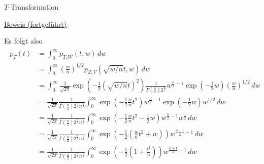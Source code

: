 \documentclass[
  8pt,
  ignorenonframetext,
]{beamer}
\begin{document}
\begin{frame}{\(T\)-Transformation}
\protect\hypertarget{t-transformation-6}{}
\footnotesize

\underline{Beweis (fortgeführt)} \vspace{1mm}

Es folgt also \tiny \begin{align}
\begin{split}
p_T(t)
& =
\int_0^\infty  p_{T,W}(t,w)
\,dw                                                    \\
& =
\int_0^\infty
\left(\frac{w}{n}\right)^{1/2}
p_{Z,V}\left(\sqrt{w/n}t,w\right)
\,dw  \\
& =
\int_0^\infty
\frac{1}{\sqrt{2\pi}}\exp\left(-\frac{1}{2}(\sqrt{w/n}t)^2\right)
\frac{1}{\Gamma(\frac{n}{2})2^{\frac{n}{2}}}w^{\frac{n}{2}-1} \exp\left(-\frac{1}{2}w\right)
\left(\frac{w}{n}\right)^{1/2}
\,dw \\
& =
\frac{1}{\sqrt{2\pi}}\frac{1}{\Gamma(\frac{n}{2})2^{\frac{n}{2}}n^{\frac{1}{2}}}
\int_0^\infty
\exp\left(-\frac{1}{2}\frac{w}{n}t^2\right)
w^{\frac{n}{2}-1} \exp\left(-\frac{1}{2}w\right)w^{1/2}
\,dw \\
& =
\frac{1}{\sqrt{2\pi}}\frac{1}{\Gamma(\frac{n}{2})2^{\frac{n}{2}}n^{\frac{1}{2}}}
\int_0^\infty
\exp\left(-\frac{1}{2}\frac{w}{n}t^2 -\frac{1}{2}w\right)
w^{\frac{n}{2}-1} w^{\frac{1}{2}}
\,dw \\
& =
\frac{1}{\sqrt{2\pi}}\frac{1}{\Gamma(\frac{n}{2})2^{\frac{n}{2}}n^{\frac{1}{2}}}
\int_0^\infty
\exp\left(-\frac{1}{2}\left(\frac{w}{n}t^2 + w\right)\right)
w^{\frac{n + 1}{2}-1}
\,dw \\
& =
\frac{1}{\sqrt{2\pi}}\frac{1}{\Gamma(\frac{n}{2})2^{\frac{n}{2}}n^{\frac{1}{2}}}
\int_0^\infty
\exp\left(-\frac{1}{2}\left(1 + \frac{t^2}{n}\right)\right)
w^{\frac{n + 1}{2}-1}
\,dw \\
\end{split}
\end{align}
\end{frame}
\end{document}
